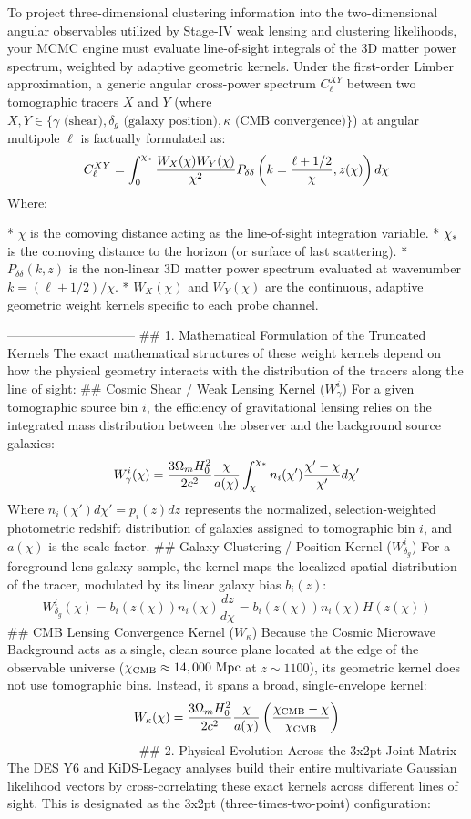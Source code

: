 To project three-dimensional clustering information into the two-dimensional angular observables utilized by Stage-IV weak lensing and clustering likelihoods, your MCMC engine must evaluate line-of-sight integrals of the 3D matter power spectrum, weighted by adaptive geometric kernels.
Under the first-order Limber approximation, a generic angular cross-power spectrum $C_\ell^{XY}$ between two tomographic tracers $X$ and $Y$ (where $X, Y \in \{\gamma \text{ (shear)}, \delta_g \text{ (galaxy position)}, \kappa \text{ (CMB convergence)}\}$) at angular multipole $\ell$ is factually formulated as:
$$C_\ell^{XY} = \int_{0}^{\chi_{\rm *}} \frac{W_X(\chi) W_Y(\chi)}{\chi^2} P_{\delta \delta} \left( k = \frac{\ell + 1/2}{\chi}, z(\chi) \right) d\chi$$ 
Where:

* $\chi$ is the comoving distance acting as the line-of-sight integration variable.
* $\chi_{\rm *}$ is the comoving distance to the horizon (or surface of last scattering).
* $P_{\delta \delta}(k, z)$ is the non-linear 3D matter power spectrum evaluated at wavenumber $k = (\ell + 1/2)/\chi$.
* $W_X(\chi)$ and $W_Y(\chi)$ are the continuous, adaptive geometric weight kernels specific to each probe channel.

------------------------------
## 1. Mathematical Formulation of the Truncated Kernels
The exact mathematical structures of these weight kernels depend on how the physical geometry interacts with the distribution of the tracers along the line of sight:
## Cosmic Shear / Weak Lensing Kernel ($W_\gamma^i$)
For a given tomographic source bin $i$, the efficiency of gravitational lensing relies on the integrated mass distribution between the observer and the background source galaxies:
$$W_\gamma^i(\chi) = \frac{3 \Omega_m H_0^2}{2 c^2} \frac{\chi}{a(\chi)} \int_{\chi}^{\chi_{\rm *}} n_i(\chi') \frac{\chi' - \chi}{\chi'} d\chi'$$ 
Where $n_i(\chi')d\chi' = p_i(z)dz$ represents the normalized, selection-weighted photometric redshift distribution of galaxies assigned to tomographic bin $i$, and $a(\chi)$ is the scale factor.
## Galaxy Clustering / Position Kernel ($W_{\delta_g}^i$)
For a foreground lens galaxy sample, the kernel maps the localized spatial distribution of the tracer, modulated by its linear galaxy bias $b_i(z)$:
$$W_{\delta_g}^i(\chi) = b_i\left(z(\chi)\right) n_i\left(\chi\right) \frac{dz}{d\chi} = b_i\left(z(\chi)\right) n_i\left(\chi\right) H\left(z(\chi)\right)$$ 
## CMB Lensing Convergence Kernel ($W_\kappa$)
Because the Cosmic Microwave Background acts as a single, clean source plane located at the edge of the observable universe ($\chi_{\rm CMB} \approx 14,000 \text{ Mpc}$ at $z \sim 1100$), its geometric kernel does not use tomographic bins. Instead, it spans a broad, single-envelope kernel:
$$W_\kappa(\chi) = \frac{3 \Omega_m H_0^2}{2 c^2} \frac{\chi}{a(\chi)} \left( \frac{\chi_{\rm CMB} - \chi}{\chi_{\rm CMB}} \right)$$ 
------------------------------
## 2. Physical Evolution Across the 3x2pt Joint Matrix
The DES Y6 and KiDS-Legacy analyses build their entire multivariate Gaussian likelihood vectors by cross-correlating these exact kernels across different lines of sight. This is designated as the 3x2pt (three-times-two-point) configuration:

